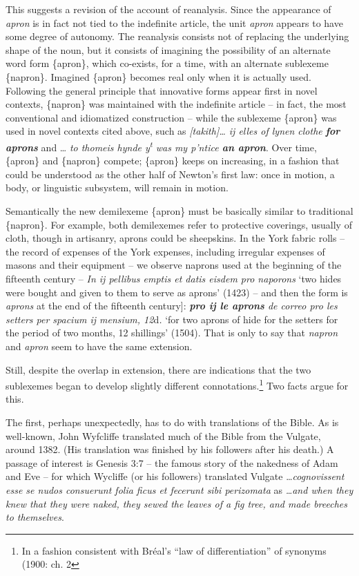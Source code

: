 \documentclass[output=paper,
modfonts
]{LSP/langsci}
\begin{document}
This suggests a revision of the account of reanalysis. Since the
appearance of \emph{apron} is in fact not tied to the indefinite
article, the unit \emph{apron} appears to have some degree of autonomy.
The reanalysis consists not of replacing the underlying shape of the
noun, but it consists of imagining the possibility of an alternate word
form \{apron\}, which co-exists, for a time, with an alternate sublexeme
\{napron\}. Imagined \{apron\} becomes real only when it is actually
used. Following the general principle that innovative forms appear first
in novel contexts, \{napron\} was maintained with the indefinite
article -- in fact, the most conventional and idiomatized
construction -- while the sublexeme \{apron\} was used in novel contexts
cited above, such as \emph{{[}takith{]}\ldots{} ij elles of lynen
clothe} \emph{\textbf{for aprons}} and \ldots{} \emph{to thomeis hynde
y\textsuperscript{t} was my p'ntice \textbf{an apron}}. Over time,
\{apron\} and \{napron\} compete; \{apron\} keeps on increasing, in a
fashion that could be understood as the other half of Newton's first
law: once in motion, a body, or linguistic subsystem, will remain in
motion.

Semantically the new demilexeme \{apron\} must be basically similar to
traditional \{napron\}. For example, both demilexemes refer to
protective coverings, usually of cloth, though in artisanry, aprons
could be sheepskins. In the York fabric rolls -- the record of expenses
of the York expenses, including irregular expenses of masons and their
equipment -- we observe naprons used at the beginning of the fifteenth
century -- \emph{In ij pellibus emptis et datis eisdem pro naporons} `two
hides were bought and given to them to serve as aprons' (1423) -- and
then the form is \emph{aprons} at the end of the fifteenth century{]}:
\emph{\textbf{pro ij le aprons} de correo pro les setters per spacium ij
mensium, 12}d\emph{.} `for two aprons of hide for the setters for the
period of two months, 12 shillings' (1504). That is only to say that
\emph{napron} and \emph{apron} seem to have the same extension.

Still, despite the overlap in extension, there are indications that the
two sublexemes began to develop slightly different
connotations.\footnote{In a fashion consistent with Bréal's ``law of differentiation'' of synonyms (1900: ch. 2} Two facts argue for this.

The first, perhaps unexpectedly, has to do with translations of the
Bible. As is well-known, John Wyfcliffe translated much of the Bible
from the Vulgate, around 1382. (His translation was finished by his
followers after his death.) A passage of interest is Genesis 3:7 -- the
famous story of the nakedness of Adam and Eve -- for which Wycliffe (or
his followers) translated Vulgate \ldots{}\emph{cognovissent esse se
nudos consuerunt folia ficus et fecerunt sibi perizomata} as
\emph{\ldots{}and when they knew that they were naked, they sewed the
leaves of a fig tree, and made breeches to themselves}.
\end{document}
